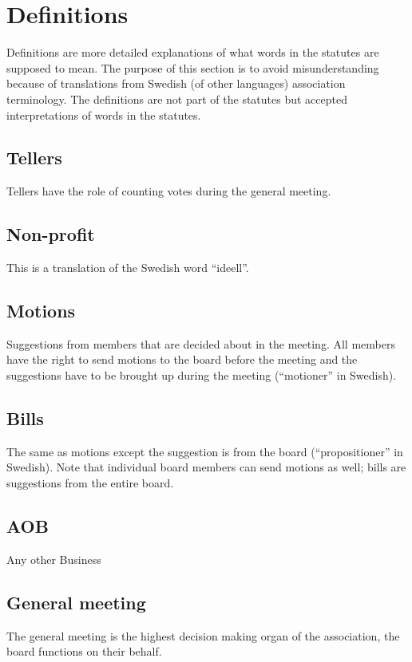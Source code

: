 \section*{Definitions}

Definitions are more detailed explanations of what words in the statutes are supposed to mean. The purpose of this section is to avoid misunderstanding because of translations from Swedish (of other languages) association terminology. The definitions are not part of the statutes but accepted interpretations of words in the statutes. 

\subsection*{Tellers}
Tellers have the role of counting votes during the general meeting.

\subsection*{Non-profit}
This is a translation of the Swedish word “ideell”.

\subsection*{Motions}
Suggestions from members that are decided about in the meeting. All members have the right to send motions to the board before the meeting and the suggestions have to be brought up during the meeting (“motioner” in Swedish). 

\subsection*{Bills}
The same as motions except the suggestion is from the board (“propositioner” in Swedish). Note that individual board members can send motions as well; bills are suggestions from the entire board.

\subsection*{AOB}
Any other Business 

\subsection*{General meeting}
The general meeting is the highest decision making organ of the association, the board functions on their behalf. 

